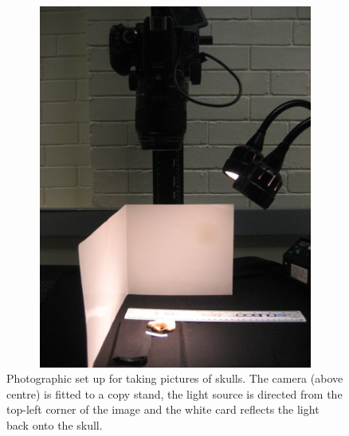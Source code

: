 \documentclass[12pt,a4paper]{article}
\begin{document}
\begin{figure}[H] 
  \centering
  \includegraphics[width=12cm, height=12cm, keepaspectratio=true]{figures/camera.jpg}
    \caption[Photographic set up]%
    {Photographic set up for taking pictures of skulls. The camera (above centre) is fitted to a copy stand, the light source is directed from the top-left corner of the image and the white card reflects the light back onto the skull. }%
  \label{fig:camera}
  \end{figure}

\end{document}
